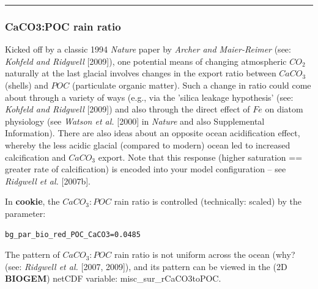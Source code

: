 \vspace{1mm} \noindent\rule{4cm}{0.5pt} \vspace{2mm}

\subsubsection*{CaCO3:POC rain ratio}

\vspace{2mm}
Kicked off by a classic 1994 \textit{Nature} paper by \textit{Archer and Maier-Reimer} (see: \textit{Kohfeld and Ridgwell} [2009]), one potential means of changing atmospheric \(CO_{2}\) naturally at the last glacial involves changes in the export ratio between \(CaCO_{3}\) (shells) and \(POC\) (particulate organic matter). Such a change in ratio could come about through a variety of ways (e.g., via the 'silica leakage hypothesis' (see: \textit{Kohfeld and Ridgwell} [2009]) and also through the direct effect of \(Fe\) on diatom physiology (see \textit{Watson et al.} [2000] in \textit{Nature} and also Supplemental Information). There are also ideas about an opposite ocean acidification effect, whereby the less acidic glacial (compared to modern) ocean led to increased calcification and \(CaCO_{3}\) export. Note that this response (higher saturation == greater rate of calcification) is encoded into your model configuration – see \textit{Ridgwell et al.} [2007b].

\vspace{1mm}
In \textbf{cookie}, the \(CaCO_{3}:POC\) rain ratio is controlled (technically: scaled) by the parameter:
\vspace{-1mm}\small\begin{verbatim}
bg_par_bio_red_POC_CaCO3=0.0485
\end{verbatim}\normalsize\vspace{-1mm}

The pattern of \(CaCO_{3}:POC\) rain ratio is not uniform across the ocean (why? (see: \textit{Ridgwell et al.} [2007, 2009]), and its pattern can be viewed in the (2D \textbf{BIOGEM}) netCDF variable: \textsf{\footnotesize misc\_sur\_rCaCO3toPOC}.

